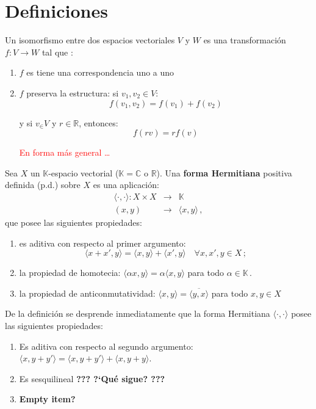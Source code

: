 \section{Definiciones}\label{sec:def}

\begin{mydef}
Un isomorfismo entre dos espacios vectoriales $V$ y $W$ es una transformaci\'on  $f:V \rightarrow W$ tal que \cite{wikibooksIsom}:

\begin{enumerate}
\item $f$ es tiene una correspondencia uno a uno
\item $f$ preserva la estructura: si $v_1, v_2 \in V$:
$$f(v_1, v_2) = f(v_1) + f(v_2)$$

y si $v_ \in V$ y $r \in \mathbb{R}$, entonces:
$$f(rv)= r f(v)$$

\textcolor{red}{En forma m\'as general \ldots}

\end{enumerate}

\end{mydef}

\begin{mydef}
Sea $X$ un $\mathbb{K}$-espacio vectorial
{\rm ($\mathbb{K}=\mathbb{C}$ o $\mathbb{R}$)}. 
Una \textbf{forma Hermitiana} positiva definida (p.d.) sobre $X$
es una aplicaci\'on:
\begin{eqnarray*}
\langle\cdot,\cdot\rangle: X\times X & \rightarrow & \mathbb{K} \\
(x,y) & \rightarrow & \langle x,y \rangle\,,
\end{eqnarray*}
que posee las siguientes propiedades:
\begin{enumerate}
\item
es aditiva con respecto al primer argumento:
$$
\langle x+x',y \rangle = \langle x,y \rangle + \langle x',y \rangle
\quad \forall x,x',y \in X\,;
$$
\item
la propiedad de homotecia:
$\langle\alpha x,y\rangle = \alpha\langle x,y\rangle$ 
para todo $\alpha\in\mathbb{K}$\,.
\item
la propiedad de anticonmutatividad:
$\langle x,y\rangle=\overline{\langle y,x\rangle}$
para todo $x,y\in X$
\end{enumerate}
\end{mydef}

\smallskip\noindent
De la definici\'on se desprende inmediatamente que la forma Hermitiana
$\langle\cdot,\cdot\rangle$ posee las siguientes propiedades:
\begin{enumerate}
\item
Es aditiva con respecto al segundo argumento:
$\langle x,y+y'\rangle = \langle x,y+y'\rangle+\langle x,y+y\rangle$.
\item
Es sesquilineal {\color{red}\bf ??? ?`Qu\'e sigue? ???}
\item
{\color{red}\bf Empty item?}
\end{enumerate}

